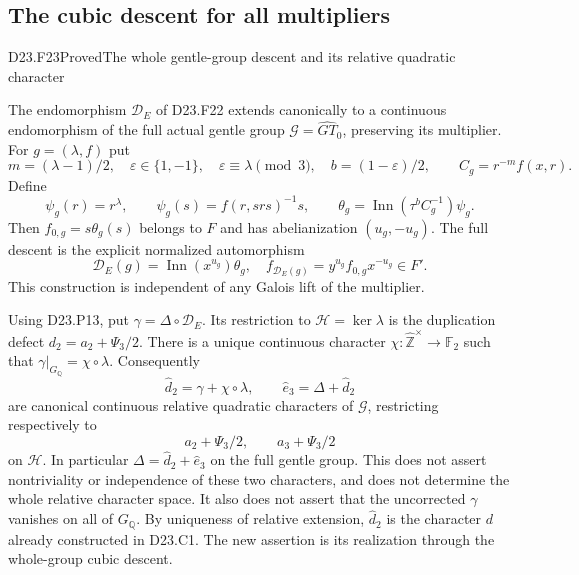\subsection{The cubic descent for all multipliers}

\begin{statement}{D23.F23}{Proved}{The whole gentle-group descent and its relative quadratic character}
\end{statement}
The endomorphism $\mathcal D_E$ of \textup{D23.F22} extends canonically
to a continuous endomorphism of the full actual gentle group
$\mathcal G=\widehat{GT}_0$, preserving its multiplier.
For $g=(\lambda,f)$ put
\[
 m=(\lambda-1)/2,\quad
 \varepsilon\in\{1,-1\},\quad\varepsilon\equiv\lambda\pmod3,
 \quad b=(1-\varepsilon)/2,
 \qquad C_g=r^{-m}f(x,r).
\]
Define
\[
 \psi_g(r)=r^\lambda,\qquad
 \psi_g(s)=f(r,srs)^{-1}s,\qquad
 \theta_g=\operatorname{Inn}(\tau^b C_g^{-1})\psi_g.
\]
Then $f_{0,g}=s\theta_g(s)$ belongs to $F$ and has abelianization
$(u_g,-u_g)$. The full descent is the explicit normalized automorphism
\[
 \boxed{\quad
 \mathcal D_E(g)=\operatorname{Inn}(x^{u_g})\theta_g,
 \quad f_{\mathcal D_E(g)}=y^{u_g}f_{0,g}x^{-u_g}\in F'.
 \quad}                                                     \tag{D23.F23.1}
\]
This construction is independent of any Galois lift of the multiplier.

Using \textup{D23.P13}, put $\gamma=\Delta\circ\mathcal D_E$.
Its restriction to $\mathcal H=\ker\lambda$ is the duplication
defect $d_2=a_2+\Psi_3/2$. There is a unique continuous character
$\chi:\widehat{\mathbb Z}^{\times}\to\mathbb F_2$ such that
$\gamma|_{G_{\mathbb Q}}=\chi\circ\lambda$.
Consequently
\[
 \widehat d_2=\gamma+\chi\circ\lambda,\qquad
 \widehat e_3=\Delta+\widehat d_2                             \tag{D23.F23.2}
\]
are canonical continuous relative quadratic characters of
$\mathcal G$, restricting respectively to
\[
 a_2+\Psi_3/2,\qquad a_3+\Psi_3/2
\]
on $\mathcal H$. In particular
$\Delta=\widehat d_2+\widehat e_3$ on the full gentle group.
This does not assert nontriviality or independence of these two
characters, and does not determine the whole relative character space.
It also does not assert that the uncorrected $\gamma$ vanishes on
all of $G_{\mathbb Q}$.
By uniqueness of relative extension, $\widehat d_2$ is the
character $d$ already constructed in D23.C1. The new assertion
is its realization through the whole-group cubic descent.

